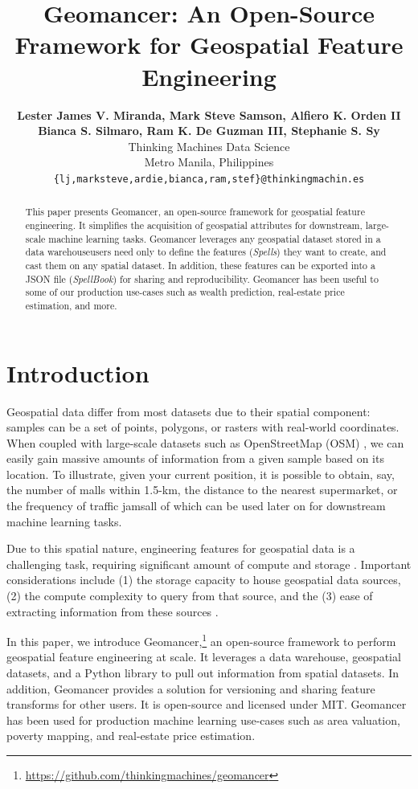 \documentclass{article}
\title{Geomancer: An Open-Source Framework for Geospatial Feature Engineering}
\author{%
  \textbf{Lester James V. Miranda, Mark Steve Samson, Alfiero K. Orden II}\\
  \textbf{Bianca S. Silmaro, Ram K. De Guzman III, Stephanie S. Sy}\\
  Thinking Machines Data Science\\
  Metro Manila, Philippines\\
  \texttt{\{lj,marksteve,ardie,bianca,ram,stef\}@thinkingmachin.es} \\
}
\begin{document}
\maketitle

\begin{abstract}
    This paper presents Geomancer, an open-source framework for geospatial
    feature engineering. It simplifies the acquisition of geospatial attributes
    for downstream, large-scale machine learning tasks.  Geomancer leverages
    any geospatial dataset stored in a data warehouse\textemdash users need only to
    define the features (\textit{Spells}) they want to create, and cast them on
    any spatial dataset. In addition, these features can be exported into a
    JSON file (\textit{SpellBook}) for sharing and reproducibility.  Geomancer
    has been useful to some of our production use-cases such as wealth
    prediction, real-estate price estimation, and more.
\end{abstract}

\section{Introduction}

Geospatial data differ from most datasets due to their spatial component:
samples can be a set of points, polygons, or rasters with real-world
coordinates. When coupled with large-scale datasets such as OpenStreetMap (OSM)
\cite{osm2017}, we can easily gain massive amounts of information from a given
sample based on its location. To illustrate, given your current position, it is
possible to obtain, say, the number of malls within 1.5-km, the distance to the
nearest supermarket, or the frequency of traffic jams\textemdash all of which
can be used later on for downstream machine learning tasks. 

Due to this spatial nature, engineering features for geospatial data is a
challenging task, requiring significant amount of compute and storage
\cite{nargesian2017learning, nargesian2018dataset, storcheus2015survey}.
Important considerations include (1) the storage capacity to house geospatial
data sources, (2) the compute complexity to query from that source, and the (3)
ease of extracting information from these sources \cite{klien2005requirements}. 

In this paper, we introduce
Geomancer,\footnote{\url{https://github.com/thinkingmachines/geomancer}} an
open-source framework to perform geospatial feature engineering at scale. It
leverages a data warehouse, geospatial datasets, and a Python library to pull
out information from spatial datasets. In addition, Geomancer provides a
solution for versioning and sharing feature transforms for other users. It is
open-source and licensed under MIT. Geomancer has been used for production
machine learning use-cases such as area valuation, poverty mapping, and
real-estate price estimation.
\end{document}
